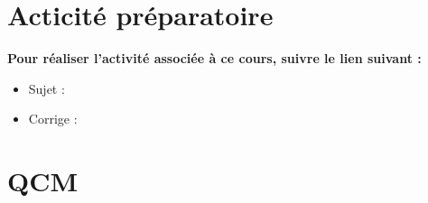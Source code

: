 \section{Acticité préparatoire}
\textbf{Pour réaliser l'activité associée à ce cours, suivre le lien suivant : }
\begin{itemize} 
\item Sujet : %
\item Corrige : %
\end{itemize}

\newpage
\section{QCM}

